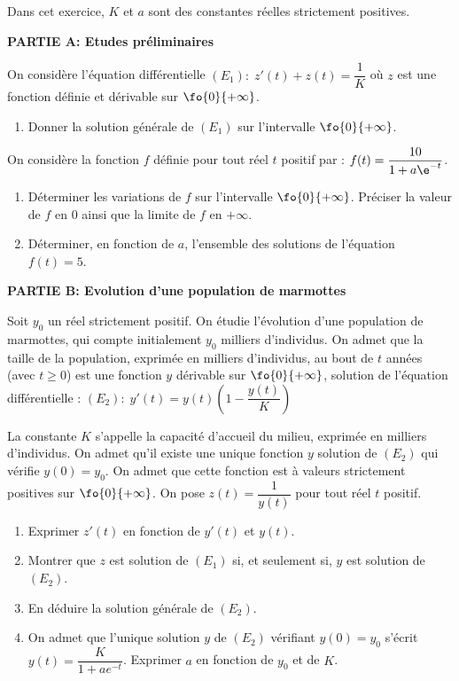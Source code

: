 \begin{exercice_cours}[\quad]{}

Dans cet exercice, $K$ et $a$ sont des constantes réelles strictement positives.

\medskip

\textbf{PARTIE A: Etudes préliminaires}

\medskip

On considère l'équation différentielle $(E_1):\; z'(t)+z(t)=\dfrac{1}{K}$ où $z$ est une fonction définie et dérivable sur $\fo{0}{+\infty}$.


\begin{enumerate}[series=B]
	\item Donner la solution générale de $(E_1)$ sur l'intervalle $\fo{0}{+\infty}$.
\end{enumerate}

On considère la fonction $f$ définie pour tout réel $t$ positif par : $f(t)=\dfrac{10}{1+a\e^{-t}}$.

\begin{enumerate}[series=B, resume]
	\item Déterminer les variations de $f$ sur l'intervalle $\fo{0}{+\infty}$. Préciser la valeur de $f$ en $0$ ainsi que la limite de $f$ en $+\infty$.
	\item Déterminer, en fonction de $a$, l'ensemble des solutions de l'équation $f(t)=5$.
\end{enumerate}

\medskip

\textbf{PARTIE B: Evolution d'une population de marmottes}
\medskip

Soit $y_0$ un réel strictement positif. On étudie l'évolution d'une population de marmottes, qui compte initialement $y_0$ milliers d'individus. On admet que la taille de la population, exprimée en milliers d'individus, au bout de $t$ années (avec $t \geq 0$) est une fonction $y$ dérivable sur $\fo{0}{+\infty}$, solution de l'équation différentielle : $(E_2):\; y'(t)=y(t)\left(1-\dfrac{y(t)}{K}\right)$ \par La constante $K$ s'appelle la capacité d'accueil du milieu, exprimée en milliers d'individus. On admet qu'il existe une unique fonction $y$ solution de $(E_2)$ qui vérifie $y(0)=y_0$. On admet que cette fonction est à valeurs strictement positives sur $\fo{0}{+\infty}$. On pose $z(t)=\dfrac{1}{y(t)}$ pour tout réel $t$ positif.

\begin{enumerate}[series=B, resume]
	\item Exprimer $z'(t)$ en fonction de $y'(t)$ et $y(t)$.
	\item Montrer que $z$ est solution de $(E_1)$ si, et seulement si, $y$ est solution de $(E_2)$. 
	\item En déduire la solution générale de $(E_2)$.
	\item On admet que l'unique solution $y$ de $(E_2)$ vérifiant $y(0)=y_0$ s'écrit $y(t)=\dfrac{K}{1+ae^{-t}}$. Exprimer $a$ en fonction de $y_0$ et de $K$.	
\end{enumerate}


\end{exercice_cours}
